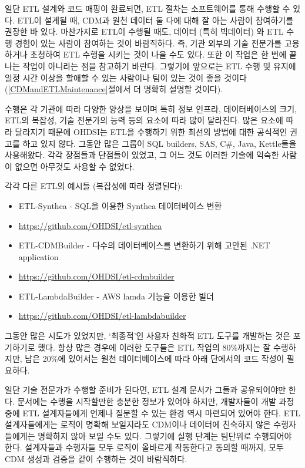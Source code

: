 \documentclass[11pt]{book}
\providecommand{\tightlist}{%
  \setlength{\itemsep}{0pt}\setlength{\parskip}{0pt}}
\theoremstyle{definition}
\theoremstyle{definition}
\theoremstyle{definition}
\theoremstyle{remark}
\begin{document}
일단 ETL 설계와 코드 매핑이 완료되면, ETL 절차는 소프트웨어를 통해
수행할 수 있다. ETL이 설계될 때, CDM과 원천 데이터 둘 다에 대해 잘 아는
사람이 참여하기를 권장한 바 있다. 마찬가지로 ETL이 수행될 때도, 데이터
(특히 빅데이터) 와 ETL 수행 경험이 있는 사람이 참여하는 것이 바람직하다.
즉, 기관 외부의 기술 전문가를 고용하거나 초청하여 ETL 수행을 시키는 것이
나을 수도 있다. 또한 이 작업은 한 번에 끝나는 작업이 아니라는 점을
참고하기 바란다. 그렇기에 앞으로는 ETL 수행 및 유지에 일정 시간 이상을
할애할 수 있는 사람이나 팀이 있는 것이 좋을 것이다
(\ref{CDMandETLMaintenance}절에서 더 명확히 설명할 것이다).

수행은 각 기관에 따라 다양한 양상을 보이며 특히 정보 인프라,
데이터베이스의 크기, ETL의 복잡성, 기술 전문가의 능력 등의 요소에 따라
많이 달라진다. 많은 요소에 따라 달라지기 때문에 OHDSI는 ETL을 수행하기
위한 최선의 방법에 대한 공식적인 권고를 하고 있지 않다. 그동안 많은
그룹이 SQL builders, SAS, C\#, Java, Kettle들을 사용해왔다. 각각
장점들과 단점들이 있었고, 그 어느 것도 이러한 기술에 익숙한 사람이
없으면 아무것도 사용할 수 없었다.

각각 다른 ETL의 예시들 (복잡성에 따라 정렬된다):

\begin{itemize}
\tightlist
\item
  ETL-Synthea - SQL을 이용한 Synthea 데이터베이스 변환
\item
  \url{https://github.com/OHDSI/etl-synthea}
\item
  ETL-CDMBuilder - 다수의 데이터베이스를 변환하기 위해 고안된 .NET
  application
\item
  \url{https://github.com/OHDSI/etl-cdmbuilder}
\item
  ETL-LambdaBuilder - AWS lamda 기능을 이용한 빌더
\item
  \url{https://github.com/OHDSI/etl-lambdabuilder}
\end{itemize}

그동안 많은 시도가 있었지만, `최종적'인 사용자 친화적 ETL 도구를
개발하는 것은 포기하기로 했다. 항상 많은 경우에 이러한 도구들은 ETL
작업의 80\%까지는 잘 수행하지만, 남은 20\%에 있어서는 원천
데이터베이스에 따라 아래 단에서의 코드 작성이 필요하다.

일단 기술 전문가가 수행할 준비가 된다면, ETL 설계 문서가 그들과
공유되어야만 한다. 문서에는 수행을 시작할만한 충분한 정보가 있어야
하지만, 개발자들이 개발 과정 중에 ETL 설계자들에게 언제나 질문할 수 있는
환경 역시 마련되어 있어야 한다. ETL 설계자들에게는 로직이 명확해
보일지라도 CDM이나 데이터에 친숙하지 않은 수행자들에게는 명확하지 않아
보일 수도 있다. 그렇기에 실행 단계는 팀단위로 수행되어야 한다.
설계자들과 수행자들 모두 로직이 올바르게 작동한다고 동의할 때까지, 모두
CDM 생성과 검증을 같이 수행하는 것이 바람직하다.
\end{document}
